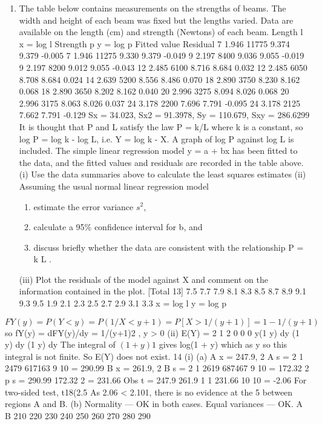 \documentclass[a4paper,12pt]{article}
\begin{document}
\begin{enumerate}
\newpage
\item  The table below contains measurements on the strengths of beams. The width
and height of each beam was fixed but the lengths varied. Data are available
on the length (cm) and strength (Newtons) of each beam.
Length l x = log l Strength
p
y = log p Fitted value Residual
7 1.946 11775 9.374 9.379 -0.005
7 1.946 11275 9.330 9.379 -0.049
9 2.197 8400 9.036 9.055 -0.019
9 2.197 8200 9.012 9.055 -0.043
12 2.485 6100 8.716 8.684 0.032
12 2.485 6050 8.708 8.684 0.024
14 2.639 5200 8.556 8.486 0.070
18 2.890 3750 8.230 8.162 0.068
18 2.890 3650 8.202 8.162 0.040
20 2.996 3275 8.094 8.026 0.068
20 2.996 3175 8.063 8.026 0.037
24 3.178 2200 7.696 7.791 -0.095
24 3.178 2125 7.662 7.791 -0.129
Sx = 34.023, Sx2 = 91.3978, Sy = 110.679, Sxy = 286.6299
It is thought that P and L satisfy the law P = k/L where k is a constant, so
log P = log k - log L, i.e. Y = log k - X.
A graph of log P against log L is included.
The simple linear regression model y = a + bx has been fitted to the data, and
the fitted values and residuals are recorded in the table above.
(i) Use the data summaries above to calculate the least squares estimates
(ii) Assuming the usual normal linear regression model

\begin{enumerate}
\item estimate the error variance $s^2$,
\item calculate a 95\% confidence interval for b, and
\item discuss briefly whether the data are consistent with the
relationship P = k L . 
\end{enumerate}

(iii) Plot the residuals of the model against X and comment on the
information contained in the plot. 
[Total 13]
7.5
7.7
7.9
8.1
8.3
8.5
8.7
8.9
9.1
9.3
9.5
1.9 2.1 2.3 2.5 2.7 2.9 3.1 3.3
x = log l
y = log p


\end{enumerate}
\newpage

\item 
\[FY(y) = P(Y < y) = P(1/X < y + 1) = P[X > 1/(y + 1)] = 1 - 1/(y + 1)\]
so fY(y) = dFY(y)/dy = 1/(y+1)2 , y > 0
(ii) E(Y) = 2 1 2
0 0 0
y(1 y) dy (1 y) dy (1 y) dy
The integral of $(1 + y) 1$ gives log(1 + y) which 
as y 
 so this
integral is not finite. So E(Y) does not exist.
14 (i) (a) A
x = 247.9, 2
A
s =
2 1 2479
617163
9 10
= 290.99
B
x = 261.9, 2
B
s =
2 1 2619
687467
9 10
= 172.32
2
p
s =
290.99 172.32
2
= 231.66
Obs t =
247.9 261.9
1 1
231.66
10 10
= -2.06
For two-sided test, t18(2.5%
As 2.06 < 2.101, there is no evidence at the 5%
between regions A and B.
(b)
Normality — OK in both cases.
Equal variances — OK.
A
B
210 220 230 240 250 260 270 280 290
\end{document}
